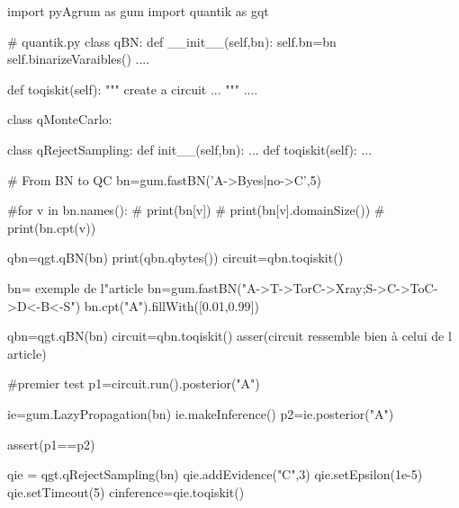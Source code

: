 import pyAgrum as gum
import quantik as gqt

# quantik.py
class qBN:
    def __init__(self,bn):
        self.bn=bn
        self.binarizeVaraibles()
        ....
        
    def toqiskit(self):
        """
        create a circuit ...
        """
        ....

class qMonteCarlo:
    

class qRejectSampling:
    def init__(self,bn):
        ...
    def toqiskit(self):
        ...
        

# From BN to QC
bn=gum.fastBN('A->B{yes|no}->C',5)

#for v in bn.names():
#  print(bn[v])
#  print(bn[v].domainSize())
#  print(bn.cpt(v))

qbn=qgt.qBN(bn)
print(qbn.qbytes())
circuit=qbn.toqiskit()

bn= exemple de l"article
bn=gum.fastBN("A->T->TorC->Xray;S->C->ToC->D<-B<-S")
bn.cpt("A").fillWith([0.01,0.99])

qbn=qgt.qBN(bn)
circuit=qbn.toqiskit()
asser(circuit ressemble bien à celui de l article)

#premier  test
p1=circuit.run().posterior("A")

ie=gum.LazyPropagation(bn)
ie.makeInference()
p2=ie.posterior("A")

assert(p1==p2)


qie = qgt.qRejectSampling(bn)
qie.addEvidence("C",3)
qie.setEpsilon(1e-5)
qie.setTimeout(5)
cinference=qie.toqiskit()

